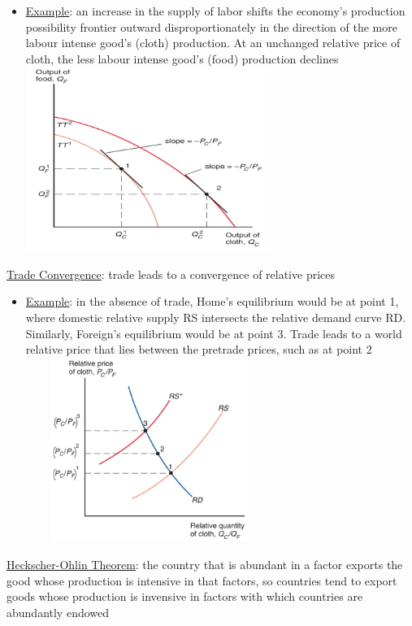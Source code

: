 \documentclass{article}
\begin{document}
\begin{itemize}
  \item  \underline{Example}: an increase in the supply of labor shifts the economy’s production possibility frontier outward disproportionately in the direction of the more labour intense good's (cloth) production. At an unchanged relative price of cloth, the less labour intense good's (food) production declines \\
  \includegraphics[width=8cm, height=6cm]{pic4}
\end{itemize}
\underline{Trade Convergence}: trade leads to a convergence of relative prices
\begin{itemize}
  \item  \underline{Example}: in the absence of trade, Home’s equilibrium would be at point 1, where domestic relative supply RS intersects the relative demand curve RD. Similarly, Foreign’s equilibrium would be at point 3. Trade leads to a world relative price that lies between the pretrade prices, such as at point 2 \\
  \includegraphics[width=8cm, height=6cm]{pic5}
\end{itemize}
\underline{Heckscher-Ohlin Theorem}: the country that is abundant in a factor exports the good whose production is intensive in that factors, so countries tend to export goods whose production is invensive in factors with which countries are abundantly endowed \\
\end{document}
